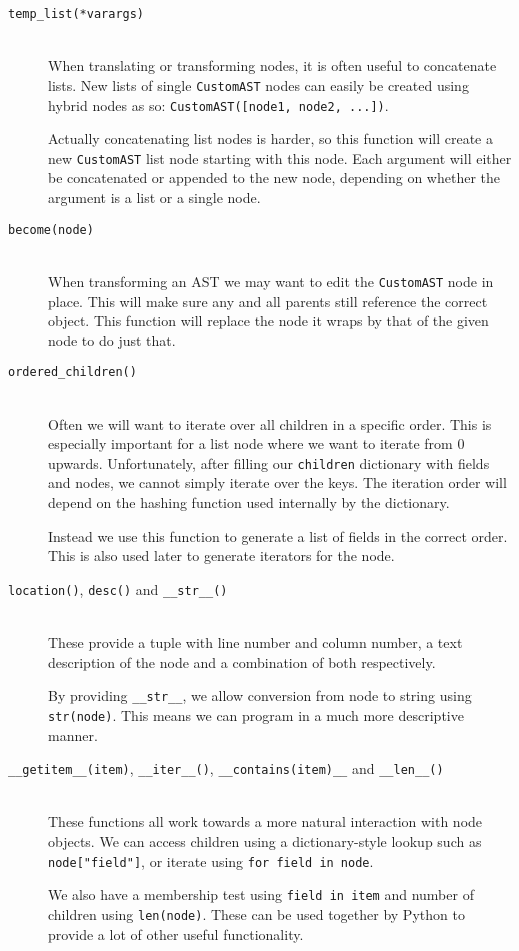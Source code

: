 \documentclass[twoside,a4paper]{report}
\begin{document}
\begin{description}
\item[\texttt{temp\_list(*varargs)}] \hfill \\
When translating or transforming nodes, it is often useful to concatenate lists. New lists of single \texttt{CustomAST} nodes can easily be
created using hybrid nodes as so: \texttt{CustomAST([node1, node2, ...])}.

Actually concatenating list nodes is harder, so this function will create a new \texttt{CustomAST} list node starting with this node. Each argument will either be
concatenated or appended to the new node, depending on whether the argument is a list or a single node.

\item[\texttt{become(node)}] \hfill \\
When transforming an AST we may want to edit the \texttt{CustomAST} node in place. This will make sure any and all parents still reference the correct
object. This function will replace the node it wraps by that of the given node to do just that.

\item[\texttt{ordered\_children()}] \hfill \\
Often we will want to iterate over all children in a specific order. This is especially important for a list node where we want to iterate from $0$ upwards.
Unfortunately, after filling our \texttt{children} dictionary with fields and nodes, we cannot simply iterate over the keys. The iteration order will
depend on the hashing function used internally by the dictionary.

Instead we use this function to generate a list of fields in the correct order. This is also used later to generate iterators for the node.

\item[\texttt{location()}, \texttt{desc()} and \texttt{\_\_str\_\_()}] \hfill \\
These provide a tuple with line number and column number, a text description of the node and a combination of both respectively.

By providing \texttt{\_\_str\_\_}, we allow conversion from node to string using \texttt{str(node)}. This means we can program in a much more
descriptive manner.

\item[\texttt{\_\_getitem\_\_(item)}, \texttt{\_\_iter\_\_()}, \texttt{\_\_contains(item)\_\_} and \texttt{\_\_len\_\_()}] \hfill \\
These functions all work towards a more natural interaction with node objects. We can access children using a dictionary-style lookup
such as \texttt{node["field"]}, or iterate using \texttt{for field in node}.

We also have a membership test using \texttt{field in item} and number of children using \texttt{len(node)}. These can be used together by Python to provide
a lot of other useful functionality.

\end{description}
\end{document}
